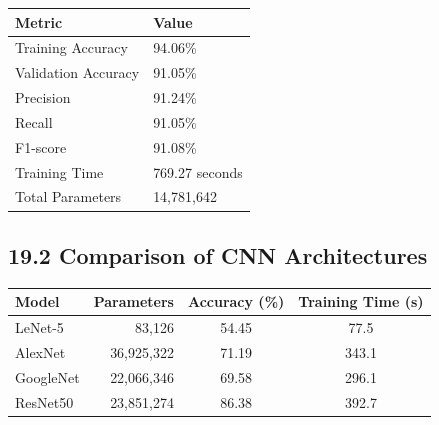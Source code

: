 \documentclass[11pt]{article}
\begin{document}
\begin{center}

\begin{tabular}{|p{5cm}|p{4cm}|}

\hline

Metric & Value\\

\hline

Training Accuracy & 94.06\%\\

\hline

Validation Accuracy & 91.05\%\\

\hline

Precision & 91.24\%\\

\hline

Recall & 91.05\%\\

\hline

F1-score & 91.08\%\\

\hline

Training Time & 769.27 seconds\\

\hline

Total Parameters & 14,781,642\\

\hline

\end{tabular}

\end{center}

\vspace{5mm}

\subsection*{19.2 Comparison of CNN Architectures}

\begin{center}

\begin{tabular}{|l|r|c|c|}

\hline

Model & Parameters & Accuracy (\%) & Training Time (s)\\

\hline

LeNet-5 & 83,126 & 54.45 & 77.5\\

\hline

AlexNet & 36,925,322 & 71.19 & 343.1\\

\hline

GoogleNet & 22,066,346 & 69.58 & 296.1\\

\hline

ResNet50 & 23,851,274 & 86.38 & 392.7\\

\hline

\end{tabular}

\end{center}
\end{document}
